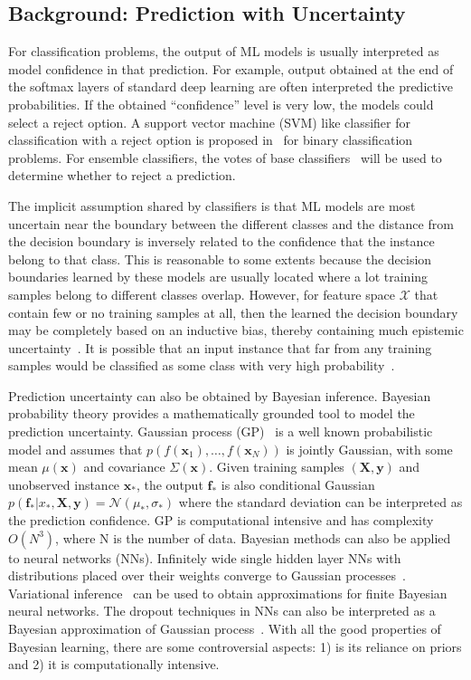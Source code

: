 
\subsection{Background: Prediction with Uncertainty}
For classification problems,  the output of ML models is usually interpreted as model confidence in that prediction. For example,  output obtained at the end of the softmax layers of standard deep learning are often interpreted the predictive probabilities. If the obtained ``confidence'' level is very low, the models could select a reject option. A support vector machine (SVM) like classifier for classification with a reject option is proposed in~\cite{bartlett2008} for binary classification problems. For ensemble classifiers, the votes of base classifiers~\cite{varshney2013practical} will be used to determine whether to reject a prediction.  

The implicit assumption shared by classifiers is that ML models are most uncertain near the boundary between the different classes  and the distance from the decision boundary is inversely related to the confidence that the instance belong to that class. This is reasonable  to some extents because the decision boundaries learned by these models are usually located where a lot training samples belong to different classes overlap.   However, for feature space $\mathcal X$ that  contain few or no training samples at all,  then the learned the decision boundary may be completely based on an inductive bias, thereby containing much epistemic uncertainty~\cite{Attenberg:2015}. It is possible that an input instance that far from any training samples would be classified as some class  with very high probability~\cite{gal2016dropout}. 

Prediction uncertainty can also be obtained by Bayesian inference.  Bayesian probability theory provides a mathematically grounded tool to model the prediction uncertainty.   Gaussian process (GP)~\cite{seeger2004gaussian} is a  well known   probabilistic model and assumes that $p(f(\mathbf x_1), \ldots, f(\mathbf x_N ))$ is jointly Gaussian, with some mean $\mu(\mathbf x)$ and covariance $\Sigma(\mathbf x)$.  Given training samples $(\mathbf X,\mathbf y)$ and unobserved instance $\mathbf x_*$, the output $\mathbf f_*$ is also conditional Gaussian $p(\mathbf f_*|x_*,\mathbf X,\mathbf y)=\mathcal N(\mu_*,\sigma_*)$ where the standard deviation can be interpreted as the prediction confidence. GP is  computational intensive and has complexity $O(N^3)$, where N is the number of data.  Bayesian methods can also be applied to neural networks (NNs). Infinitely wide single hidden layer NNs with distributions placed over their weights converge to Gaussian processes~\cite{neal2012bayesian}. Variational inference~\cite{paisley2012variational,kingma2013auto} can be used to obtain  approximations for finite Bayesian neural networks. The  dropout  techniques in NNs can also be interpreted as a Bayesian approximation of  Gaussian process~\cite{gal2016dropout}. With all the good properties of Bayesian learning,  there are some  controversial aspects: 1) is its reliance on priors and  2) it is  computationally intensive.

